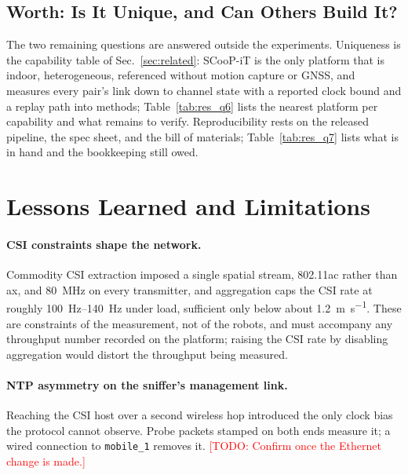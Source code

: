 \documentclass[journal]{IEEEtran}
\newcommand{\todo}[1]{\textcolor{red}{[TODO: #1]}}
\begin{document}




\subsection{Worth: Is It Unique, and Can Others Build It?}
\label{sec:worth}
The two remaining questions are answered outside the experiments.
Uniqueness is the capability table of Sec.~\ref{sec:related}:
SCooP-iT is the only platform that is indoor, heterogeneous, referenced
without motion capture or GNSS, and measures every pair's link down to
channel state with a reported clock bound and a replay path into
methods; Table~\ref{tab:res_q6} lists the nearest platform per
capability and what remains to verify. Reproducibility rests on the
released pipeline, the spec sheet, and the bill of materials;
Table~\ref{tab:res_q7} lists what is in hand and the bookkeeping still
owed.





\section{Lessons Learned and Limitations}
\label{sec:lessons}

\paragraph{CSI constraints shape the network.} Commodity CSI extraction
imposed a single spatial stream, 802.11ac rather than ax, and
\SI{80}{\mega\hertz} on every transmitter, and aggregation caps the
CSI rate at roughly \SIrange{100}{140}{\hertz} under load, sufficient
only below about \SI{1.2}{\metre\per\second}. These are constraints of
the measurement, not of the robots, and must accompany any throughput
number recorded on the platform; raising the CSI rate by disabling
aggregation would distort the throughput being measured.

\paragraph{NTP asymmetry on the sniffer's management link.} Reaching
the CSI host over a second wireless hop introduced the only clock bias
the protocol cannot observe. Probe packets stamped on both ends
measure it; a wired connection to \texttt{mobile\_1} removes it.
\todo{Confirm once the Ethernet change is made.}
\end{document}
